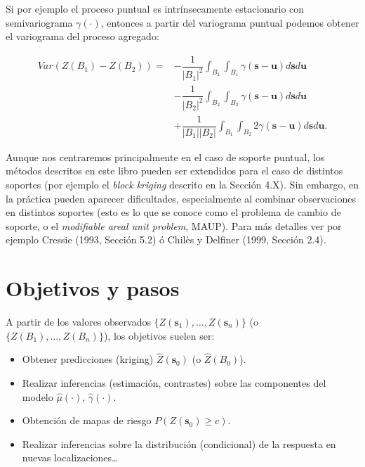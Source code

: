 \documentclass[
  spanish,
]{book}
\theoremstyle{break}
\theoremstyle{definition}
\theoremstyle{definition}
\theoremstyle{definition}
\theoremstyle{definition}
\theoremstyle{remark}
\begin{document}
Si por ejemplo el proceso puntual es intrínsecamente estacionario con semivariograma \(\gamma (\cdot)\), entonces a partir del variograma puntual podemos obtener el variograma del proceso agregado:

\[\begin{aligned}
Var\left( Z(B_1)-Z(B_2)\right) = & -\dfrac{1}{\left| B_1 \right| ^{2} } 
\int_{B_1 }\int_{B_1 }\gamma(\mathbf{s}-\mathbf{u})d\mathbf{s}d\mathbf{u}   \\
  & -\dfrac{1}{\left| B_2 \right|^{2} } \int_{B_2}\int_{B_2}\gamma(\mathbf{s}-\mathbf{u})d\mathbf{s}d\mathbf{u}   \\
 & +\dfrac{1}{\left| B_1 \right| \left| B_2 \right| } \int_{B_1 }\int_{B_2} 2\gamma(\mathbf{s}-\mathbf{u})d\mathbf{s}d\mathbf{u}. 
\end{aligned}\]

Aunque nos centraremos principalmente en el caso de soporte puntual, los métodos descritos en este libro pueden ser extendidos para el caso de distintos soportes (por ejemplo el \emph{block kriging} descrito en la Sección 4.X).
Sin embargo, en la práctica pueden aparecer dificultades, especialmente al combinar observaciones en distintos soportes (esto es lo que se conoce como el problema de cambio de soporte, o el \emph{modifiable areal unit problem}, MAUP).
Para más detalles ver por ejemplo Cressie (1993, Sección 5.2) ó Chilès y Delfiner (1999, Sección 2.4).

\hypertarget{objetivos-esquema}{%
\section{Objetivos y pasos}\label{objetivos-esquema}}

A partir de los valores observados \(\{Z(\mathbf{s}_1), \ldots, Z(\mathbf{s}_n)\}\) (o \(\{Z(B_1), \ldots, Z(B_n)\}\)), los objetivos suelen ser:

\begin{itemize}
\item
  Obtener predicciones (kriging) \(\hat{Z}(\mathbf{s}_0)\) (o \(\hat{Z}(B_0)\)).
\item
  Realizar inferencias (estimación, contrastes) sobre las componentes
  del modelo \(\hat{\mu}(\cdot)\), \(\hat{\gamma}(\cdot)\).
\item
  Obtención de mapas de riesgo \(P({Z}(\mathbf{s}_0)\geq c)\).
\item
  Realizar inferencias sobre la distribución (condicional) de la respuesta
  en nuevas localizaciones\ldots{}
\end{itemize}
\end{document}
